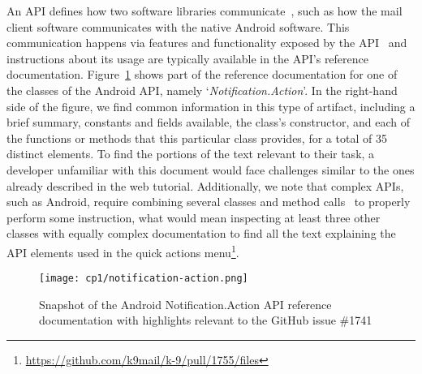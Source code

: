 An API %
defines how  two software libraries communicate~\cite{robillard2011field},
such as how the mail client software communicates 
with the native Android software. This communication happens via features and functionality exposed by the API~\cite{Robillard2015} 
and instructions about its usage are typically available in the API's reference documentation.
Figure~\ref{fig:api-notification-action} shows part of the reference documentation for one of the classes of the Android API, namely `\textit{Notification.Action}'. 
In the right-hand side of the figure, we find common 
information in this type of artifact, including a brief summary,
constants and fields available, the class's constructor, and 
each of the functions or methods that this particular class provides,  
for a total of 35 distinct elements.
To find the portions of the text relevant to
their task,
a developer unfamiliar with this document would 
face challenges similar to the ones already  described in the web tutorial. Additionally, 
we note that complex APIs, 
such as Android, require combining several classes
and method calls~\cite{robillard2011field} to properly perform some instruction,
what would mean inspecting at least three other classes 
with equally complex documentation
to find all the text explaining the API elements used in the quick actions menu\footnote{\url{https://github.com/k9mail/k-9/pull/1755/files}}.





\begin{figure}
    \centering
    \texttt{[image: cp1/notification-action.png]}
    \caption{Snapshot of the Android Notification.Action API reference documentation with highlights relevant to the GitHub issue \#1741}
    \label{fig:api-notification-action}
\end{figure}




